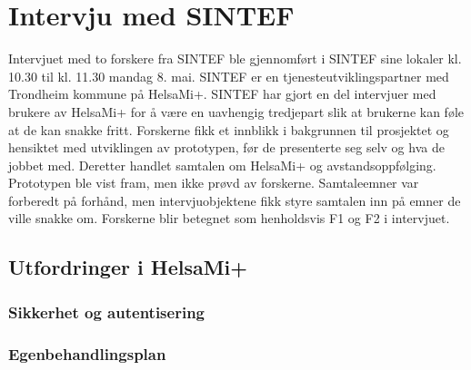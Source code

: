 
\section{Intervju med SINTEF}\label{intervju-med-sintef}
Intervjuet med to forskere fra SINTEF ble gjennomført i SINTEF sine lokaler
kl. 10.30 til kl. 11.30 mandag 8. mai. SINTEF er en tjenesteutviklingspartner med
Trondheim kommune på HelsaMi+. SINTEF har gjort en del intervjuer med brukere av
HelsaMi+ for å være en uavhengig tredjepart slik at brukerne kan føle at de kan snakke fritt.
Forskerne fikk et innblikk i bakgrunnen til prosjektet og hensiktet med utviklingen av prototypen,
før de presenterte seg selv og hva de jobbet med. Deretter handlet samtalen om
HelsaMi+ og avstandsoppfølging. Prototypen ble vist fram, men ikke prøvd av
forskerne. Samtaleemner var forberedt på forhånd, men intervjuobjektene fikk styre samtalen inn på emner
de ville snakke om.
Forskerne blir betegnet som henholdsvis F1 og F2 i intervjuet.

\subsection{Utfordringer i HelsaMi+}

\subsubsection{Sikkerhet og autentisering}
\subsubsection{Egenbehandlingsplan}


